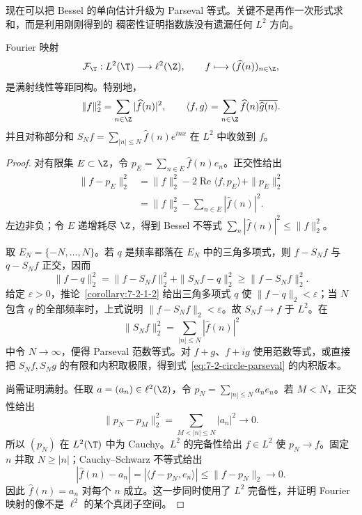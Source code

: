 现在可以把 Bessel 的单向估计升级为 Parseval 等式。关键不是再作一次形式求和，而是利用刚刚得到的
稠密性证明指数族没有遗漏任何 $L^2$ 方向。

\begin{theorem}\label{theorem:7-2-1-3}
Fourier 映射
\[
 \mathcal F_\T:L^2(\T)\longrightarrow\ell^2(\Z),
 \qquad f\longmapsto(\widehat f(n))_{n\in\Z},
\]
是满射线性等距同构。特别地，
\begin{equation}\label{eq:7-2-circle-parseval}
 \|f\|_2^2=\sum_{n\in\Z}|\widehat f(n)|^2,
 \qquad
 \langle f,g\rangle
 =\sum_{n\in\Z}\widehat f(n)\overline{\widehat g(n)}.
\end{equation}
并且对称部分和 $S_Nf=\sum_{|n|\leq N}\widehat f(n)e^{inx}$ 在 $L^2$ 中收敛到 $f$。
\end{theorem}

\begin{proof}
对有限集 $E\subset\Z$，令 $p_E=\sum_{n\in E}\widehat f(n)e_n$。正交性给出
\begin{align*}
 \|f-p_E\|_2^2
 &=\|f\|_2^2-2\operatorname{Re}\langle f,p_E\rangle+\|p_E\|_2^2\\
 &=\|f\|_2^2-\sum_{n\in E}|\widehat f(n)|^2.
\end{align*}
左边非负；令 $E$ 递增耗尽 $\Z$，得到 Bessel 不等式
$\sum_n|\widehat f(n)|^2\leq\|f\|_2^2$。

取 $E_N=\{-N,\ldots,N\}$。若 $q$ 是频率都落在 $E_N$ 中的三角多项式，则
$f-S_Nf$ 与 $q-S_Nf$ 正交，因而
\[
 \|f-q\|_2^2
 =\|f-S_Nf\|_2^2+\|S_Nf-q\|_2^2
 \geq\|f-S_Nf\|_2^2.
\]
给定 $\varepsilon>0$，推论~\ref{corollary:7-2-1-2} 给出三角多项式 $q$ 使
$\|f-q\|_2<\varepsilon$；当 $N$ 包含 $q$ 的全部频率时，上式说明
$\|f-S_Nf\|_2<\varepsilon$。故 $S_Nf\to f$ 于 $L^2$。在
\[
 \|S_Nf\|_2^2=\sum_{|n|\leq N}|\widehat f(n)|^2
\]
中令 $N\to\infty$，便得 Parseval 范数等式。对 $f+g$、$f+ig$ 使用范数等式，或直接把
$S_Nf,S_Ng$ 的有限和内积取极限，得到式~\eqref{eq:7-2-circle-parseval} 的内积版本。

尚需证明满射。任取 $a=(a_n)\in\ell^2(\Z)$，令
$p_N=\sum_{|n|\leq N}a_ne_n$。若 $M<N$，正交性给出
\[
 \|p_N-p_M\|_2^2=\sum_{M<|n|\leq N}|a_n|^2\longrightarrow0.
\]
所以 $(p_N)$ 在 $L^2(\T)$ 中为 Cauchy。$L^2$ 的完备性给出
$f\in L^2$ 使 $p_N\to f$。固定 $n$ 并取 $N\geq|n|$；Cauchy--Schwarz 不等式给出
\[
 |\widehat f(n)-a_n|
 =|\langle f-p_N,e_n\rangle|
 \leq\|f-p_N\|_2\longrightarrow0.
\]
因此 $\widehat f(n)=a_n$ 对每个 $n$ 成立。这一步同时使用了 $L^2$ 完备性，并证明 Fourier
映射的像不是 $\ell^2$ 的某个真闭子空间。
\end{proof}


